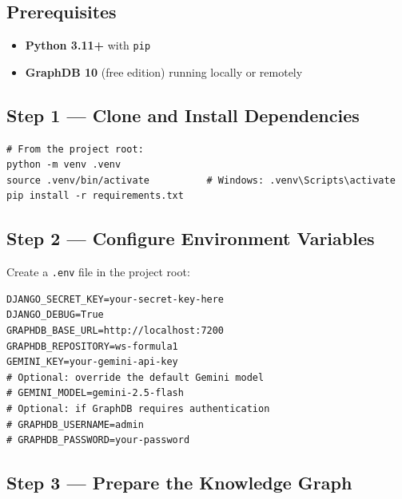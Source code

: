 \documentclass[12pt,a4paper]{article}
\begin{document}
\subsection{Prerequisites}

\begin{itemize}[leftmargin=1.5em]
  \item \textbf{Python 3.11+} with \texttt{pip}
  \item \textbf{GraphDB 10} (free edition) running locally or remotely
\end{itemize}

\subsection{Step 1 --- Clone and Install Dependencies}

\begin{lstlisting}[style=shell]
# From the project root:
python -m venv .venv
source .venv/bin/activate          # Windows: .venv\Scripts\activate
pip install -r requirements.txt
\end{lstlisting}

\subsection{Step 2 --- Configure Environment Variables}

Create a \texttt{.env} file in the project root:

\begin{lstlisting}[style=shell]
DJANGO_SECRET_KEY=your-secret-key-here
DJANGO_DEBUG=True
GRAPHDB_BASE_URL=http://localhost:7200
GRAPHDB_REPOSITORY=ws-formula1
GEMINI_KEY=your-gemini-api-key
# Optional: override the default Gemini model
# GEMINI_MODEL=gemini-2.5-flash
# Optional: if GraphDB requires authentication
# GRAPHDB_USERNAME=admin
# GRAPHDB_PASSWORD=your-password
\end{lstlisting}

\subsection{Step 3 --- Prepare the Knowledge Graph}
\end{document}
